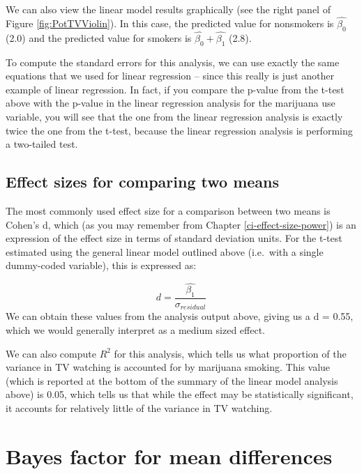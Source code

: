 \documentclass[
  12pt,
]{book}
\begin{document}
We can also view the linear model results graphically (see the right panel of Figure \ref{fig:PotTVViolin}). In this case, the predicted value for nonsmokers is \(\hat{\beta_0}\) (2.0) and the predicted value for smokers is \(\hat{\beta_0} +\hat{\beta_1}\) (2.8).

To compute the standard errors for this analysis, we can use exactly the same equations that we used for linear regression -- since this really is just another example of linear regression. In fact, if you compare the p-value from the t-test above with the p-value in the linear regression analysis for the marijuana use variable, you will see that the one from the linear regression analysis is exactly twice the one from the t-test, because the linear regression analysis is performing a two-tailed test.

\hypertarget{effect-sizes-for-comparing-two-means}{%
\subsection{Effect sizes for comparing two means}\label{effect-sizes-for-comparing-two-means}}

The most commonly used effect size for a comparison between two means is Cohen's d, which (as you may remember from Chapter \ref{ci-effect-size-power}) is an expression of the effect size in terms of standard deviation units. For the t-test estimated using the general linear model outlined above (i.e.~with a single dummy-coded variable), this is expressed as:

\[
d = \frac{\hat{\beta_1}}{\sigma_{residual}}
\]
We can obtain these values from the analysis output above, giving us a d = 0.55, which we would generally interpret as a medium sized effect.

We can also compute \(R^2\) for this analysis, which tells us what proportion of the variance in TV watching is accounted for by marijuana smoking. This value (which is reported at the bottom of the summary of the linear model analysis above) is 0.05, which tells us that while the effect may be statistically significant, it accounts for relatively little of the variance in TV watching.

\hypertarget{bayes-factor-for-mean-differences}{%
\section{Bayes factor for mean differences}\label{bayes-factor-for-mean-differences}}
\end{document}
